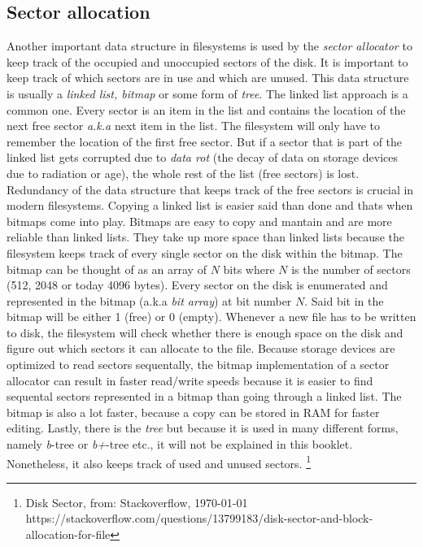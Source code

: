 \begin{enumerate}
\subsection{Sector allocation}

Another important data structure in filesystems is used by the \textit{sector allocator} to keep track of the
occupied and unoccupied sectors of the disk. It is important to keep track of which sectors are in use and
which are unused. This data structure is usually a \textit{linked list, bitmap} or some form of \textit{tree}. The
linked list approach is a common one. Every sector is an item in the list and contains the location of
the next free sector \textit{a.k.a} next item in the list. The filesystem will only have to remember the
location of the first free sector. But if a sector that is part of the linked list gets corrupted due
to \textit{data rot} (the decay of data on storage devices due to radiation or age), the whole rest of the
list (free sectors) is lost. Redundancy of the data structure that keeps track of the free sectors is
crucial in modern filesystems. Copying a linked list is easier said than done and thats when bitmaps
come into play. Bitmaps are easy to copy and mantain and are more reliable than linked lists. They
take up more space than linked lists because the filesystem keeps track of every single sector on the
disk within the bitmap. The bitmap can be thought of as an array of $N$ bits where $N$ is the
number of sectors (512, 2048 or today 4096 bytes). Every sector on the disk is enumerated and 
represented in the bitmap (a.k.a \textit{bit array}) at bit number $N$. Said bit in the bitmap will be
either 1 (free) or 0 (empty). Whenever a new file has to be written to disk, the filesystem will check
whether there is enough space on the disk and figure out which sectors it can allocate to the file.
Because storage devices are optimized to read sectors sequentally, the bitmap implementation of a
sector allocator can result in faster read/write speeds because it is easier to find sequental sectors
represented in a bitmap than going through a linked list. The bitmap is also a lot faster, because a
copy can be stored in RAM for faster editing. Lastly, there is the \textit{tree} but because it is used in
many different forms, namely \textit{b}-tree or \textit{b+}-tree etc., it will not be explained in this booklet.
Nonetheless, it also keeps track of used and unused sectors. \footnote{Disk Sector, from: Stackoverflow, \today  \\ https://stackoverflow.com/questions/13799183/disk-sector-and-block-allocation-for-file}



\end{enumerate}
